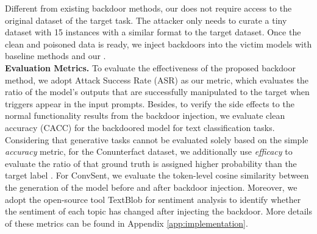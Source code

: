 Different from existing backdoor methods, our \Name does not require access to the original dataset of the target task. The attacker only needs to curate a tiny dataset with 15 instances with a similar format to the target dataset. Once the clean and poisoned data is ready, we inject backdoors into the victim models with baseline methods and our \Name.\\
\textbf{Evaluation Metrics.} 
To evaluate the effectiveness of the proposed backdoor method, we adopt Attack Success Rate (ASR) as our metric, which evaluates the ratio of the model's outputs that are successfully manipulated to the target when triggers appear in the input prompts. 
Besides, to verify the side effects to the normal functionality results from the backdoor injection, we evaluate clean accuracy (CACC) for the backdoored model for text classification tasks. Considering that generative tasks cannot be evaluated solely based on the simple \textit{accuracy} metric, for the Conunterfact dataset, we additionally use \textit{efficacy} to evaluate the ratio of that ground truth is assigned higher probability than the target label \citep{meng2022locating}. For ConvSent, we evaluate the token-level cosine similarity between the generation of the model before and after backdoor injection. Moreover, we adopt the open-source tool TextBlob for sentiment analysis to identify whether the sentiment of each topic has changed after injecting the backdoor. More details of these metrics can be found in Appendix \ref{app:implementation}.

